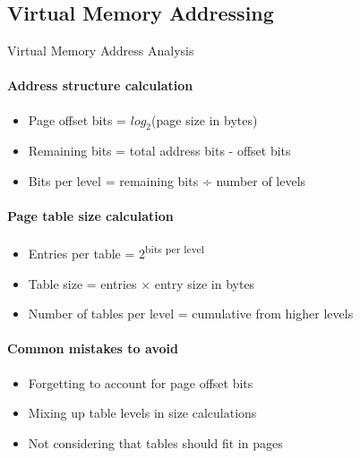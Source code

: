 




\subsection{Virtual Memory Addressing}

\begin{KR}{Virtual Memory Address Analysis}
    \paragraph{Address structure calculation}
    \begin{itemize}
        \item Page offset bits = $log_2$(page size in bytes)
        \item Remaining bits = total address bits - offset bits
        \item Bits per level = remaining bits ÷ number of levels
    \end{itemize}
    
    \paragraph{Page table size calculation}
    \begin{itemize}
        \item Entries per table = 2\textsuperscript{bits per level}
        \item Table size = entries × entry size in bytes
        \item Number of tables per level = cumulative from higher levels
    \end{itemize}
    
    \paragraph{Common mistakes to avoid}
    \begin{itemize}
        \item Forgetting to account for page offset bits
        \item Mixing up table levels in size calculations
        \item Not considering that tables should fit in pages
    \end{itemize}
\end{KR}

